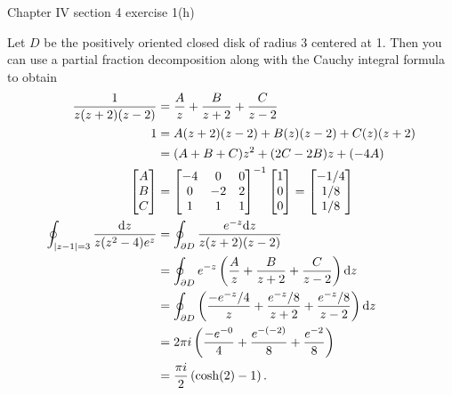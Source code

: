\documentclass{article}
\begin{document}
\bigskip
\par
\begin{prob}
    Chapter IV section 4 exercise 1(h)
\end{prob}
Let $D$ be the positively oriented closed disk of radius 3 centered at 1. Then you can use a partial fraction decomposition along with the Cauchy integral formula to obtain
\begin{align*}
    \frac{1}{z(z+2)(z-2)} &= \frac{A}{z} + \frac{B}{z+2} + \frac{C}{z-2} \\
    1 &= A(z+2)(z-2) + B(z)(z-2) + C(z)(z+2) \\
      &= (A+B+C)z^2 + (2C-2B)z + (-4A) \\
      \begin{bmatrix}
          A \\
          B \\
          C
      \end{bmatrix} &= \begin{bmatrix}
      -4 & 0 & 0 \\
      0 & -2 & 2 \\
      1 & 1 & 1
  \end{bmatrix}^{-1} \begin{bmatrix}
      1 \\
      0 \\
      0
  \end{bmatrix} = \begin{bmatrix}
      -1/4 \\
      1/8 \\
      1/8
  \end{bmatrix} \\
    \oint_{\left\lvert z-1 \right\rvert=3} \frac{\mathrm{d} z}{z(z^2-4)e^z} &= \oint_{\partial D} \frac{e^{-z}\mathrm{d} z}{z(z+2)(z-2)} \\
                                                 &= \oint_{\partial D} e^{-z} \left( \frac{A}{z} + \frac{B}{z+2} + \frac{C}{z-2} \right) \mathrm{d} z  \\
                                                 &= \oint_{\partial D} \left( \frac{-e^{-z}/4}{z} + \frac{e^{-z}/8}{z+2} + \frac{e^{-z}/8}{z-2} \right) \mathrm{d} z  \\
                                                 &= 2 \pi i \left( \frac{-e^{-0}}{4} + \frac{e^{-(-2)}}{8} + \frac{e^{-2}}{8} \right) \\
                                                 &= \frac{\pi i}{2} \left( \cosh(2) - 1 \right).
\end{align*}
\end{document}
